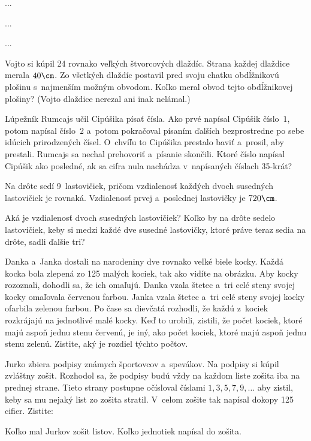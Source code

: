 {%
...}

{%
...}

{%
...}

{%
Vojto si kúpil 24 rovnako veľkých štvorcových dlaždíc. Strana každej dlaždice merala $40\cm$.
Zo všetkých dlaždíc postavil pred svoju
chatku obdĺžnikovú plošinu s~najmenším možným obvodom. Koľko
meral obvod tejto obdĺžnikovej plošiny? (Vojto dlaždice nerezal ani inak nelámal.)}

{%
Lúpežník Rumcajs učil Cipúšika písať čísla. Ako prvé napísal Cipúšik číslo~$1$, potom
napísal číslo~$2$ a~potom pokračoval písaním ďalších bezprostredne po sebe idúcich
prirodzených čísel.
O~chvíľu to Cipúšika prestalo baviť a~prosil, aby prestali. Rumcajs sa nechal
prehovoriť a~písanie skončili. Ktoré číslo napísal Cipúšik ako posledné, ak sa cifra
nula nachádza v~napísaných číslach 35-krát?}

{%
Na drôte sedí 9~lastovičiek, pričom vzdialenosť každých dvoch susedných lastovičiek je rovnaká. Vzdialenosť
prvej a~poslednej lastovičky je $720\cm$.
\begin{itemize}
  \iitem Aká je vzdialenosť dvoch susedných lastovičiek?
  \iitem Koľko by na drôte sedelo lastovičiek, keby si medzi každé dve susedné lastovičky, ktoré práve teraz sedia na drôte, sadli ďalšie tri?
\end{itemize}}

{%
Danka a~Janka dostali na narodeniny dve rovnako veľké biele kocky. Každá kocka bola zlepená zo 125 malých kociek, tak ako vidíte na \ifobrazkyvedla{}obrázku\else\obr{}\fi{}. Aby kocky rozoznali, dohodli sa, že ich omaľujú. Danka vzala štetec a~tri celé steny svojej kocky omaľovala červenou farbou. Janka vzala štetec a~tri celé steny svojej kocky ofarbila zelenou farbou. Po čase sa dievčatá rozhodli, že každú z~kociek rozkrájajú na jednotlivé malé kocky. Keď to urobili, zistili, že počet kociek, ktoré majú aspoň jednu stenu červenú, je iný, ako počet kociek, ktoré majú aspoň jednu stenu zelenú. Zistite, aký je rozdiel týchto počtov.
\ifobrazkyvedla\else{}\fi%
}

{%
Jurko zbiera podpisy známych športovcov a~spevákov. Na podpisy si kúpil zvláštny zošit. Rozhodol sa, že podpisy budú vždy na každom liste zošita iba na prednej strane. Tieto strany postupne očísloval číslami $1,3,5,7,9,\dots$ aby zistil, keby sa mu nejaký list zo zošita stratil. V~celom zošite tak napísal dokopy 125 cifier. Zistite:
\begin{itemize}
  \iitem Koľko mal Jurkov zošit listov.
  \iitem Koľko jednotiek napísal do zošita.
\end{itemize}}


